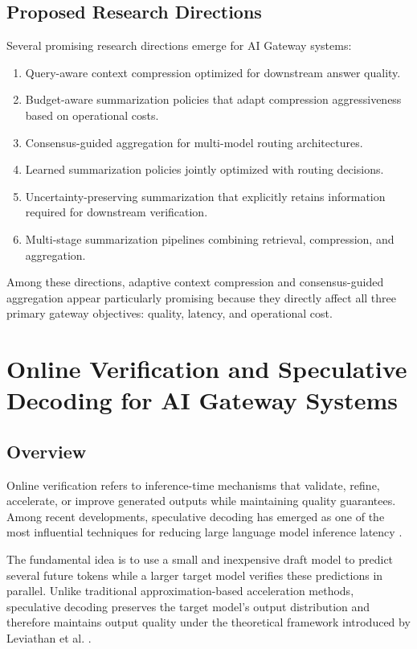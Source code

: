 \documentclass[11pt,a4paper]{article}
\begin{document}
\subsection{Proposed Research Directions}

Several promising research directions emerge for AI Gateway systems:

\begin{enumerate}
\item Query-aware context compression optimized for downstream answer quality.
\item Budget-aware summarization policies that adapt compression aggressiveness based on operational costs.
\item Consensus-guided aggregation for multi-model routing architectures.
\item Learned summarization policies jointly optimized with routing decisions.
\item Uncertainty-preserving summarization that explicitly retains information required for downstream verification.
\item Multi-stage summarization pipelines combining retrieval, compression, and aggregation.
\end{enumerate}

Among these directions, adaptive context compression and consensus-guided aggregation appear particularly promising because they directly affect all three primary gateway objectives: quality, latency, and operational cost.


\section{Online Verification and Speculative Decoding for AI Gateway Systems}

\subsection{Overview}

Online verification refers to inference-time mechanisms that validate, refine, accelerate, or improve generated outputs while maintaining quality guarantees. Among recent developments, speculative decoding has emerged as one of the most influential techniques for reducing large language model inference latency \cite{leviathan2023speculative,chen2023speculative}.

The fundamental idea is to use a small and inexpensive draft model to predict several future tokens while a larger target model verifies these predictions in parallel. Unlike traditional approximation-based acceleration methods, speculative decoding preserves the target model's output distribution and therefore maintains output quality under the theoretical framework introduced by Leviathan et al. \cite{leviathan2023speculative}.
\end{document}
